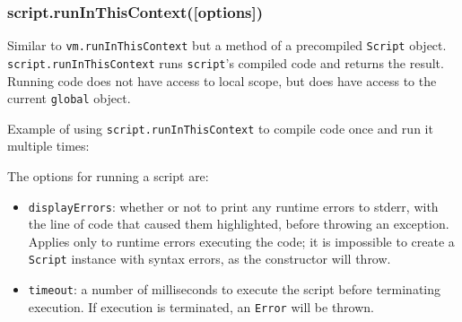 \subsubsection{script.runInThisContext({[}options{]})}\label{script.runinthiscontextoptions}

Similar to \texttt{vm.runInThisContext} but a method of a precompiled
\texttt{Script} object. \texttt{script.runInThisContext} runs
\texttt{script}'s compiled code and returns the result. Running code
does not have access to local scope, but does have access to the current
\texttt{global} object.

Example of using \texttt{script.runInThisContext} to compile code once
and run it multiple times:

\begin{Shaded}
\begin{Highlighting}[]
 \NormalTok{(}\NormalTok{);}

 \NormalTok{= }\NormalTok{;}

  \NormalTok{(}\NormalTok{, \{ }\NormalTok{: } \NormalTok{\});}

 \NormalTok{(} 
  \NormalTok{();}
\NormalTok{\}}


\end{Highlighting}
\end{Shaded}

The options for running a script are:

\begin{itemize}
\itemsep1pt\parskip0pt
\item
  \texttt{displayErrors}: whether or not to print any runtime errors to
  stderr, with the line of code that caused them highlighted, before
  throwing an exception. Applies only to runtime errors executing the
  code; it is impossible to create a \texttt{Script} instance with
  syntax errors, as the constructor will throw.
\item
  \texttt{timeout}: a number of milliseconds to execute the script
  before terminating execution. If execution is terminated, an
  \texttt{Error} will be thrown.
\end{itemize}

